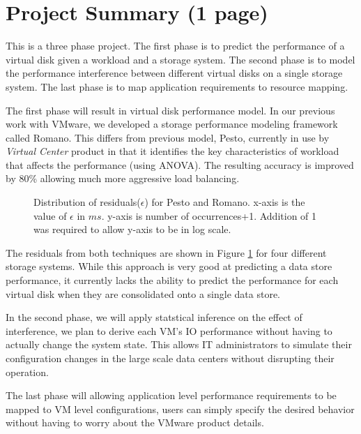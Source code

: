 \section*{Project Summary {\small (1 page)}}
%
This is a three phase project. 
The first phase is to predict the performance of a virtual disk given a workload and a storage system. 
The second phase is to model the performance interference between different virtual disks on a single storage system. 
The last phase is to map application requirements to resource mapping.

The first phase will result in virtual disk performance model. 
In our previous work with VMware, we developed a storage performance modeling framework called Romano. 
This differs from previous model, Pesto\cite{pesto}, currently in use by \emph{Virtual Center} product in that it identifies the key characteristics of workload that affects the performance (using ANOVA\cite{lilja}).
The resulting accuracy is improved by 80\% allowing much more aggressive load balancing. 
\begin{figure}[t!]
\centering
{}
\caption{Distribution of residuals($\epsilon$) for Pesto and Romano.
x-axis is the value of $\epsilon$ in $ms$.
y-axis is number of occurrences+1.
Addition of 1 was required to allow y-axis to be in log scale.
}
\label{residualDist}
\end{figure}
The residuals from both techniques are shown in Figure \ref{residualDist} for four different storage systems.
While this approach is very good at predicting a data store performance, it currently lacks the ability to predict the performance for each virtual disk when they are consolidated onto a single data store. 

In the second phase, we will apply statstical inference on the effect of interference, we plan to derive each VM's IO performance without having to actually change the system state.  
This allows IT administrators to simulate their configuration changes in the large scale data centers without disrupting their operation. 

The last phase will allowing application level performance requirements to be mapped to VM level configurations, users can simply specify the desired behavior without having to worry about the VMware product details.
